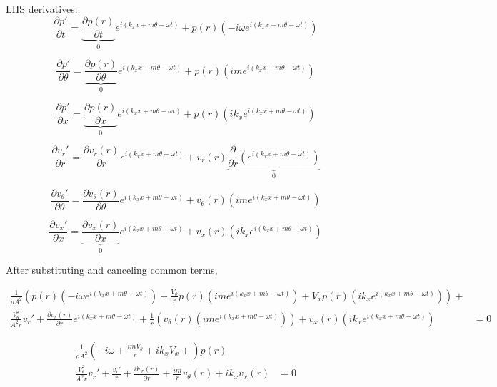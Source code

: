 \documentclass[12pt]{article}
\begin{document}
LHS derivatives:
\[\frac{\partial p'}{\partial t} =
\underbrace{\frac{\partial p(r)}{\partial t}}_{0} e^{i\left(k_x x + m \theta - \omega t \right)} +
p(r) \left(-i\omega e^{i\left(k_x x + m \theta - \omega t \right)}\right) \]

\[\frac{\partial p'}{\partial \theta} = 
\underbrace{\frac{\partial p(r)}{\partial \theta}}_{0} e^{i\left(k_x x + m \theta - \omega t \right)} + 
p(r) \left(im e^{i\left(k_x x + m \theta - \omega t \right)}\right) \]

\[\frac{\partial p'}{\partial x} = \underbrace{\frac{\partial p(r)}{\partial x}}_{0} e^{i\left(k_x x + m \theta - \omega t \right)} +
p(r) \left(ik_x e^{i\left(k_x x + m \theta - \omega t \right)}\right) \]

\[\frac{\partial v_r'}{\partial r} =
\frac{\partial v_r(r)}{\partial r} e^{i\left(k_x x + m \theta - \omega t \right)} +
v_r(r) \underbrace{\frac{\partial }{\partial r}\left( e^{i\left(k_x x + m \theta - \omega t \right)}\right)}_0 \]

\[\frac{\partial v_{\theta}'}{\partial \theta} = 
\frac{\partial v_{\theta}(r)}{\partial \theta} e^{i\left(k_x x + m \theta - \omega t \right)} + 
v_{\theta}(r) \left(im e^{i\left(k_x x + m \theta - \omega t \right)}\right) \]

\[\frac{\partial v_x'}{\partial x} = \underbrace{\frac{\partial v_x(r)}{\partial x}}_{0} e^{i\left(k_x x + m \theta - \omega t \right)} + v_x(r) \left(ik_x e^{i\left(k_x x + m \theta - \omega t \right)}\right) \]

After substituting and canceling common terms,

\begin{align*}
\frac{1}{\bar{\rho} A^2}\left(
p(r) \left(-i\omega e^{i\left(k_x x + m \theta - \omega t \right)}\right) +
\frac{V_{\theta}}{r}
p(r) \left(im e^{i\left(k_x x + m \theta - \omega t \right)}\right) + 
V_x
p(r) \left(ik_x e^{i\left(k_x x + m \theta - \omega t \right)}\right)
\right) + \\
\frac{V_{\theta}^2}{A^2 r}v_r'+
\frac{\partial v_r(r)}{\partial r} e^{i\left(k_x x + m \theta - \omega t \right)} + 
\frac{1}{r}
\left(v_{\theta}(r) \left(im e^{i\left(k_x x + m \theta - \omega t \right)}\right)\right) 
+
v_x(r) \left(ik_x e^{i\left(k_x x + m \theta - \omega t \right)}\right) 
&= 0
\end{align*}

\begin{align*}
\frac{1}{\bar{\rho} A^2} \left(-i\omega + \frac{imV_{\theta}}{r} + ik_xV_x  +
\right)p(r)  \\
\frac{V_{\theta}^2}{A^2 r}v_r'+ \frac{v_r'}{r} +
\frac{\partial v_r(r)}{\partial r}+ 
\frac{im}{r} v_{\theta}(r)
+
ik_xv_x(r) 
&= 0
\end{align*}
\end{document}
